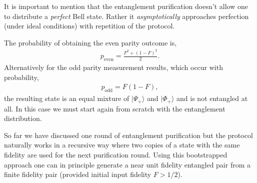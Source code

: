 \documentclass[twocolumn, aps, rmp, amsmath, amssymb, nofootinbib, superscriptaddress, longbibliography, floatfix, table-of-contents, eqsecnum]{revtex4-1}
\begin{document}
It is important to mention that the entanglement purification doesn't allow one to distribute a \textit{perfect} Bell state. Rather it \textit{asymptotically} approaches perfection (under ideal conditions) with repetition of the protocol.

The probability of obtaining the even parity outcome is,
\begin{align}
	p_\mathrm{even}=\frac{F^2+(1-F)^2}{2}.
\end{align}
Alternatively for the odd parity measurement results, which occur with probability,
\begin{align}
	p_\mathrm{odd}=F(1-F),
\end{align}
the resulting state is an equal mixture of $|\Psi_+\rangle$ and $|\Phi_+\rangle$ and is not entangled at all. In this case we must start again from scratch with the entanglement distribution.

So far we have discussed one round of entanglement purification but the protocol naturally works in a recursive way where two copies of a state with the same fidelity are used for the next purification round. Using this bootstrapped approach one can in principle generate a near unit fidelity entangled pair from a finite fidelity pair (provided initial input fidelity \mbox{$F>1/2$}). 
\end{document}
